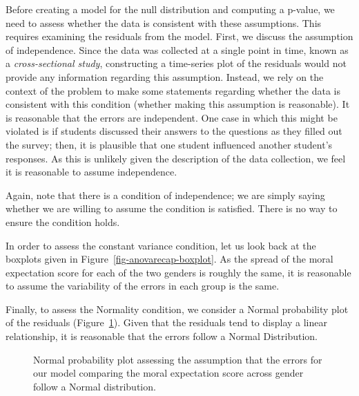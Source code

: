 \documentclass[
  letterpaper,
  DIV=11,
  numbers=noendperiod]{scrreprt}
\theoremstyle{plain}
\theoremstyle{definition}
\theoremstyle{definition}
\theoremstyle{remark}
\begin{document}
Before creating a model for the null distribution and computing a
p-value, we need to assess whether the data is consistent with these
assumptions. This requires examining the residuals from the model.
First, we discuss the assumption of independence. Since the data was
collected at a single point in time, known as a \emph{cross-sectional
study}, constructing a time-series plot of the residuals would not
provide any information regarding this assumption. Instead, we rely on
the context of the problem to make some statements regarding whether the
data is consistent with this condition (whether making this assumption
is reasonable). It is reasonable that the errors are independent. One
case in which this might be violated is if students discussed their
answers to the questions as they filled out the survey; then, it is
plausible that one student influenced another student's responses. As
this is unlikely given the description of the data collection, we feel
it is reasonable to assume independence.

Again, note that there is a condition of independence; we are simply
saying whether we are willing to assume the condition is satisfied.
There is no way to ensure the condition holds.

In order to assess the constant variance condition, let us look back at
the boxplots given in Figure~\ref{fig-anovarecap-boxplot}. As the spread
of the moral expectation score for each of the two genders is roughly
the same, it is reasonable to assume the variability of the errors in
each group is the same.

Finally, to assess the Normality condition, we consider a Normal
probability plot of the residuals
(Figure~\ref{fig-anovarecap-resids-probplot}). Given that the residuals
tend to display a linear relationship, it is reasonable that the errors
follow a Normal Distribution.

\begin{figure}


\caption{\label{fig-anovarecap-resids-probplot}Normal probability plot
assessing the assumption that the errors for our model comparing the
moral expectation score across gender follow a Normal distribution.}

\end{figure}%
\end{document}
